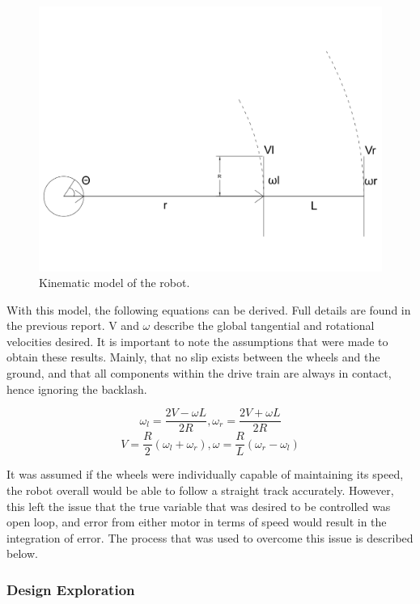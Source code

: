 \documentclass[ece]{uw-wkrpt}
\begin{document}
\begin{figure}
    \centering
    \includegraphics[width=5.5in]{res/diagram}
    \caption[Kinematic model of the robot]
          {Kinematic model of the robot.}
    \label{fig:kinematicModel}
\end{figure}

With this model, the following equations can be derived. Full details are found in the previous report. V and $\omega$ describe the global tangential and rotational velocities desired. It is important to note the assumptions that were made to obtain these results. Mainly, that no slip exists between the wheels and the ground, and that all components within the drive train are always in contact, hence ignoring the backlash.

\[\omega_l = \frac{2V-\omega L}{2R},\omega_r = \frac{2V+\omega L}{2R}\]
\[V=\frac{R}{2}(\omega_l+\omega_r),  \omega=\frac{R}{L}(\omega_r-\omega_l)\]

It was assumed if the wheels were individually capable of maintaining its speed, the robot overall would be able to follow a straight track accurately. However, this left the issue that the true variable that was desired to be controlled was open loop, and error from either motor in terms of speed would result in the integration of error. The process that was used to overcome this issue is described below.

\subsubsection{Design Exploration}
\end{document}
